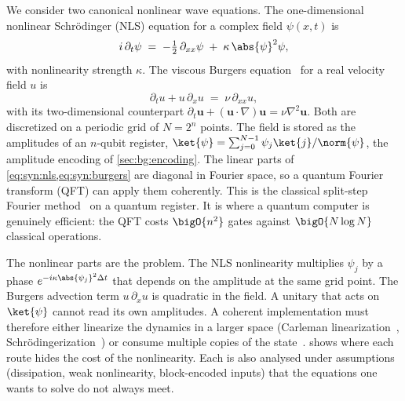 We consider two canonical nonlinear wave equations. The one-dimensional nonlinear Schr\"odinger (NLS) equation for a complex field $\psi(x,t)$ is
\begin{equation}\label{eq:syn:nls}
  i\,\partial_t\psi \;=\; -\tfrac{1}{2}\,\partial_{xx}\psi \;+\; \kappa\,\abs{\psi}^{2}\psi ,
\end{equation}
with nonlinearity strength $\kappa$. The viscous Burgers equation~\cite{burgers1948turbulence} for a real velocity field $u$ is
\begin{equation}\label{eq:syn:burgers}
  \partial_t u + u\,\partial_x u \;=\; \nu\,\partial_{xx}u ,
\end{equation}
with its two-dimensional counterpart $\partial_t \mathbf{u}+(\mathbf{u}\cdot\nabla)\mathbf{u}=\nu\nabla^{2}\mathbf{u}$. Both are discretized on a periodic grid of $N=2^{n}$ points. The field is stored as the amplitudes of an $n$-qubit register, $\ket{\psi}=\sum_{j=0}^{N-1}\psi_j\ket{j}/\norm{\psi}$, the amplitude encoding of \cref{sec:bg:encoding}. The linear parts of \cref{eq:syn:nls,eq:syn:burgers} are diagonal in Fourier space, so a quantum Fourier transform (QFT) can apply them coherently. This is the classical split-step Fourier method~\cite{weideman1986splitstep} on a quantum register. It is where a quantum computer is genuinely efficient: the QFT costs $\bigO{n^{2}}$ gates against $\bigO{N\log N}$ classical operations.

The nonlinear parts are the problem. The NLS nonlinearity multiplies $\psi_j$ by a phase $e^{-i\kappa\abs{\psi_j}^{2}\Delta t}$ that depends on the amplitude at the same grid point. The Burgers advection term $u\,\partial_x u$ is quadratic in the field. A unitary that acts on $\ket{\psi}$ cannot read its own amplitudes. A coherent implementation must therefore either linearize the dynamics in a larger space (Carleman linearization~\cite{liu2021carleman}, Schr\"odingerization~\cite{jin2024schrodingerization}) or consume multiple copies of the state~\cite{lloyd2020nonlinear}.  shows where each route hides the cost of the nonlinearity. Each is also analysed under assumptions (dissipation, weak nonlinearity, block-encoded inputs) that the equations one wants to solve do not always meet.

